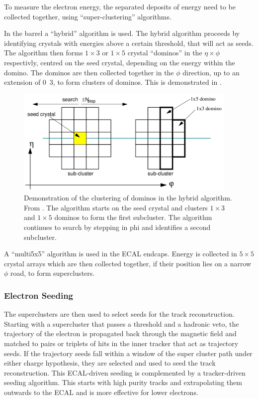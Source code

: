 To measure the electron energy, the separated deposits of energy need to be
collected together, using ``super-clustering'' algorithms. 

In the barrel a ``hybrid'' algorithm is used. The hybrid algorithm proceeds by
identifying crystals with energies above a certain threshold, that will act as
seeds. The algorithm then forms $1\times3$ or $1\times5$ crystal ``dominos'' in
the $\eta\times\phi$ respectivly, centred on the seed crystal, depending on the
energy within the domino. The dominos are then collected together in the $\phi$
direction, up to an extension of \unit{0.3}{\rad}, to form clusters of dominos.
This is demonstrated in  \cite{eECAL}.

\begin{figure}[htbp]
  \centering
  \includegraphics[width=0.95\textwidth]{hybridalgo}
  \caption{Demonstration of the clustering of dominos in the hybrid algorithm.
From \cite{eECAL}.  The algorithm starts on the seed crystal and clusters
$1\times3$ and $1\times5$ dominos to form the first subcluster. The algorithm continues to search
by stepping in phi and identifies a second subcluster.}
  \label{fig:hybrid}
\end{figure}

A ``multi5x5'' algorithm is used in the ECAL endcaps. Energy is collected in
$5\times5$ crystal arrays which are then collected together, if their position lies on
a narrow $\phi$ road, to form superclusters.

\subsubsection{Electron Seeding}
The superclusters are then used to select seeds for the track reconstruction.
Starting with a supercluster that passes a \pt threshold and a hadronic veto,
the trajectory of the electron is propagated back through the magnetic field and
matched to pairs or triplets of hits in the inner tracker that act as trajectory
seeds.  If the trajectory seeds fall within a window of the super cluster path
under either charge hypothesis, they are selected and used to seed the track
reconstruction.  This ECAL-driven seeding is complemented by a tracker-driven
seeding algorithm.  This starts with high purity tracks and extrapolating them
outwards to the ECAL and is more effective for lower \pt electrons.

